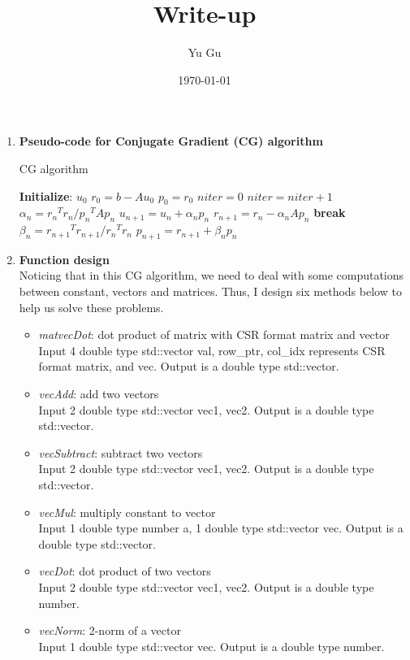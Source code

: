 \documentclass{article}
\title{Write-up}
\author{Yu Gu}
\date{\today}
\begin{document}
\maketitle

\begin{enumerate}
\item \textbf{Pseudo-code for Conjugate Gradient (CG) algorithm}
\begin{algorithm}
\caption{CG algorithm} 
\begin{algorithmic}
    \STATE \textbf{Initialize}: $u_0$
    \STATE $r_0=b-Au_0$
    \STATE $p_0=r_0$
    \STATE $niter=0$
        \STATE $niter=niter + 1$
        \STATE $\alpha_n={r_n}^Tr_n/{p_n}^TAp_n$
        \STATE $u_{n+1}=u_n+\alpha_np_n$
        \STATE $r_{n+1}=r_n-\alpha_nAp_n$
            \STATE \textbf{break}
        \ENDIF
        \STATE $\beta_n={r_{n+1}}^Tr_{n+1}/{r_n}^Tr_n$
        \STATE $p_{n+1}=r_{n+1}+\beta_np_n$
    \ENDWHILE
\end{algorithmic}
\end{algorithm}

\item \textbf{Function design}\\
Noticing that in this CG algorithm, we need to deal with some computations between constant, vectors and matrices. Thus, I design six methods below to help us solve these problems.
\begin{itemize}
\item{\emph{matvecDot}:} dot product of matrix with CSR format matrix and vector\\
Input 4 double type std::vector val, row\_ptr, col\_idx represents CSR format matrix, and vec. Output is a double type std::vector.
\item{\emph{vecAdd}:} add two vectors\\
Input 2 double type std::vector vec1, vec2. Output is a double type std::vector.
\item{\emph{vecSubtract}:} subtract two vectors\\
Input 2 double type std::vector vec1, vec2. Output is a double type std::vector.
\item{\emph{vecMul}:} multiply constant to vector\\
Input 1 double type number a, 1 double type std::vector vec. Output is a double type std::vector.
\item{\emph{vecDot}:} dot product of two vectors\\
Input 2 double type std::vector vec1, vec2. Output is a double type number.
\item{\emph{vecNorm}:} 2-norm of a vector\\
Input 1 double type std::vector vec. Output is a double type number.
\end{itemize}

\end{enumerate}
\end{document}
